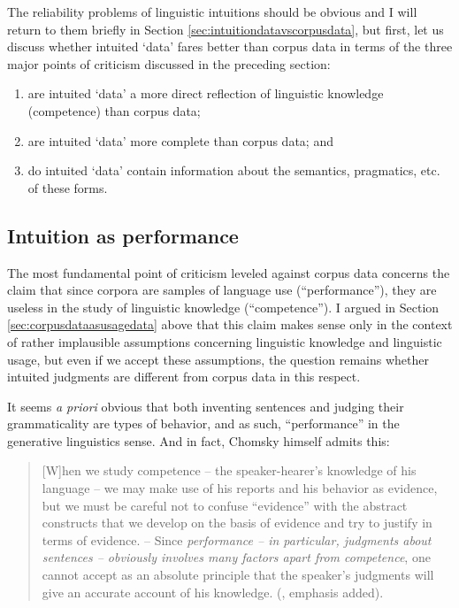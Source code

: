 The reliability problems of linguistic intuitions should be obvious and I will return to them briefly in Section \ref{sec:intuitiondatavscorpusdata}, but first, let us discuss whether intuited `data' fares better than corpus data in terms of the three major points of criticism discussed in the preceding section:

\begin{enumerate}
\item are intuited `data' a more direct reflection of linguistic knowledge (competence) than corpus data;
\item are intuited `data' more complete than corpus data; and
\item do intuited `data' contain information about the semantics, pragmatics, etc. of these forms.
\end{enumerate}

\subsection{Intuition as performance}
\label{sec:intuitionasperformance}

The most fundamental point of criticism leveled against corpus data concerns the claim that since corpora are samples of language use (``performance''), they are useless in the study of linguistic knowledge (``competence''). I argued in Section \ref{sec:corpusdataasusagedata} above that this claim makes sense only in the context of rather implausible assumptions concerning linguistic knowledge and linguistic usage, but even if we accept these assumptions, the question remains whether intuited judgments are different from corpus data in this respect.

It seems \emph{a priori} obvious that both inventing sentences and judging their grammaticality are types of behavior, and as such, ``performance'' in the generative linguistics sense. And in fact, Chomsky himself admits this:

\begin{quote}
[W]hen we study competence -- the speaker-hearer's knowledge of his language -- we may make use of his reports and his behavior as evidence, but we must be careful not to confuse ``evidence'' with the abstract constructs that we develop on the basis of evidence and try to justify in terms of evidence. -- Since \emph{performance -- in particular, judgments about sentences -- obviously involves many factors apart from competence}, one cannot accept as an absolute principle that the speaker's judgments will give an accurate account of his knowledge. (\citealt[187]{chomsky_language_1972}, emphasis added).
\end{quote}


